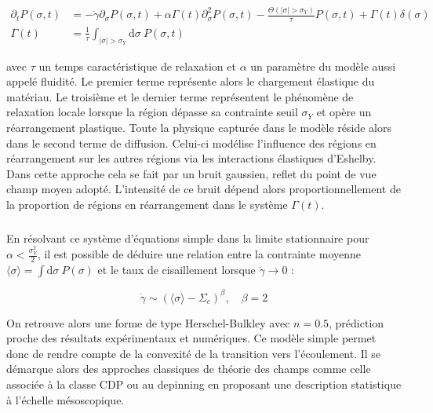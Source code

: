 \begin{equation}
\begin{aligned}
	\partial_t P(\sigma, t) &= -\dot{\gamma}\partial_\sigma P(\sigma, t) + \alpha\Gamma(t)\partial_\sigma^2P(\sigma, t) - \frac{\Theta (|\sigma|>\sigma_Y)}{\tau}P(\sigma, t) + \Gamma(t)\delta(\sigma)\\
	\Gamma(t) &= \frac{1}{\tau}\int_{|\sigma|>\sigma_Y}\mathrm{d}\sigma ~ P(\sigma, t)
\end{aligned}
\end{equation}

\noindent avec $\tau$ un temps caractéristique de relaxation et $\alpha$ un paramètre du modèle aussi appelé fluidité. Le premier terme représente alors le chargement élastique du matériau. Le troisième et le dernier terme représentent le phénomène de relaxation locale lorsque la région dépasse sa contrainte seuil $\sigma_Y$ et opère un réarrangement plastique. Toute la physique capturée dans le modèle réside alors dans le second terme de diffusion. Celui-ci modélise l'influence des régions en réarrangement sur les autres régions via les interactions élastiques d'Eshelby. Dans cette approche cela se fait par un bruit gaussien, reflet du point de vue champ moyen adopté. L'intensité de ce bruit dépend alors proportionnellement de la proportion de régions en réarrangement dans le système $\Gamma (t)$.

\subparagraph{}En résolvant ce système d'équations simple dans la limite stationnaire pour $\alpha < \frac{\sigma_Y^2}{2}$, il est possible de déduire une relation entre la contrainte moyenne $\langle \sigma \rangle =  \int \mathrm{d}\sigma ~ P(\sigma)$ et le taux de cisaillement lorsque $\dot{\gamma}\rightarrow 0$ \cite{olivier_fluides_2011, bertin_stochastic_2022} :

\begin{equation}
	\dot{\gamma} \sim (\langle \sigma \rangle - \Sigma_c)^\beta, \quad \beta = 2
\end{equation}

\noindent On retrouve alors une forme de type Herschel-Bulkley avec $n=0.5$, prédiction proche des résultats expérimentaux et numériques. Ce modèle simple permet donc de rendre compte de la convexité de la transition vers l'écoulement. Il se démarque alors des approches classiques de théorie des champs comme celle associée à la classe CDP ou au depinning en proposant une description statistique à l'échelle mésoscopique. 

